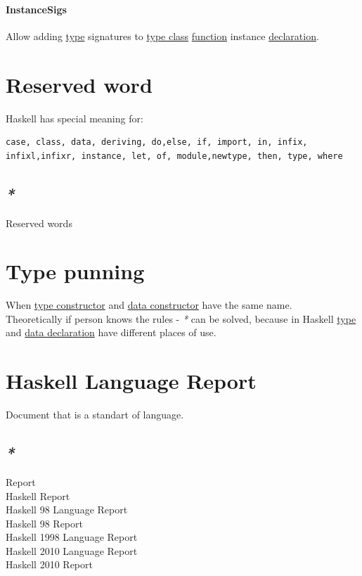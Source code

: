 \documentclass[a4paper,14pt,oneside]{book}
\begin{document}
\subsubsection{\label{orged39c26}InstanceSigs}
\label{sec:orgc05b123}
Allow adding \hyperref[orgd6db20c]{type} signatures to \hyperref[org904b85b]{type class} \hyperref[org8cc2ae4]{function} instance \hyperref[org9487164]{declaration}.\\


\chapter{\label{org9c29d93}Reserved word}
\label{sec:org01318bc}
Haskell has special meaning for:\\
\begin{verbatim}
case, class, data, deriving, do,else, if, import, in, infix, infixl,infixr, instance, let, of, module,newtype, then, type, where
\end{verbatim}

\section{\emph{*}}
\label{sec:orgb6d0fa7}
\label{org5f45513}Reserved words\\

\chapter{\label{org7f68557}Type punning}
\label{sec:orgdd7a6b4}
When \hyperref[orgec3c22c]{type constructor} and \hyperref[orgb57a4f6]{data constructor} have the same name.\\

Theoretically if person knows the rules - \emph{*} can be solved, because in Haskell \hyperref[orgd6db20c]{type} and \hyperref[org8847e57]{data declaration} have different places of use.\\

\chapter{\label{org3a9a591}Haskell Language Report}
\label{sec:orga32fca8}
Document that is a standart of language.\\

\section{\emph{*}}
\label{sec:org333bf54}
\label{orge82c53a}Report\\
\label{org0cdb677}Haskell Report\\
\label{org702890c}Haskell 98 Language Report\\
\label{org47ae806}Haskell 98 Report\\
\label{org0686836}Haskell 1998 Language Report\\
\label{orga50472d}Haskell 2010 Language Report\\
\label{org8d95ba1}Haskell 2010 Report\\
\end{document}
